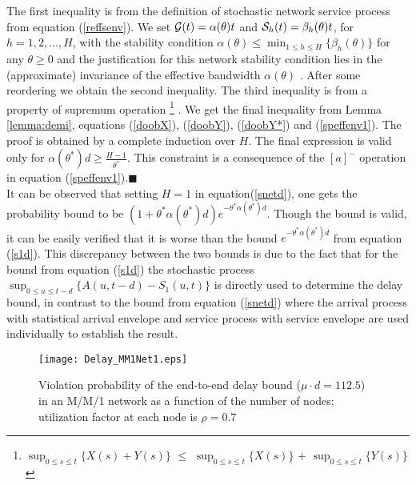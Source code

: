 \documentclass[letterpaper]{IEEEtran}
\begin{document}
The first inequality is from the definition of stochastic network service process from equation (\ref{reffsenv}). We set ${\cal G}(t) = \alpha(\theta)t$ and ${\cal S}_h(t) = \beta_h(\theta)t$, for $h = 1, 2, \ldots, H$, with the stability condition $\alpha(\theta) \le \min_{1\le h \le H }{\{ \beta_h(\theta)\}}$ for any $\theta \ge 0$ and the justification for this network stability condition lies in the (approximate) invariance of the effective bandwidth $\alpha(\theta)$ \cite{spects:2008}. After some reordering we obtain the second inequality. The third inequality is from a property of supremum operation \footnote{$ \sup_{0\le s \le t} \{X(s) + Y(s)\}$ $ \le $ $\sup_{0\le s \le t} \{X(s)\}$ $+$ $\sup_{0\le s \le t} \{Y(s)\}$} \cite{yuming:2006}. We get the final inequality from Lemma \ref{lemma:demi}, equations (\ref{doobX}), (\ref{doobY}), (\ref{doobY*}) and (\ref{speffenv1}). The proof is obtained by a complete induction over $H$. The final expression is valid only for $\alpha(\theta^*)d \ge \frac{H-1}{\theta^*}$. This constraint is a consequence of the $[a]^-$ operation in equation (\ref{speffenv1}).$\blacksquare$\\
It can be observed that setting $H=1$ in equation(\ref{snetd}), one gets the probability bound to be $(1+\theta^*\alpha(\theta^*)d)e^{-\theta^*\alpha(\theta^*)d}$. Though the bound is valid, it can be easily verified that it is worse than the bound $e^{-\theta^*\alpha(\theta^*)d}$ from equation (\ref{s1d}). This discrepancy between the two bounds is due to the fact that for the bound from equation (\ref{s1d}) the stochastic process $\sup_{0\le u \le t-d}\{A(u,t-d)-S_1(u,t)\}$ is directly used to determine the delay bound, in contrast to the bound from equation (\ref{snetd}) where the arrival process with statistical arrival envelope and service process with service envelope are used individually to establish the result. 
\begin{figure}
\centering
\texttt{[image: Delay\_MM1Net1.eps]}
\caption{Violation probability of the end-to-end delay bound ($\mu \cdot d=112.5$) in an M/M/1 network as a function of the number of
nodes; utilization factor at each node is $\rho = 0.7$}
\label{fig:demiDelay} \vspace{-5 mm}
\end{figure}
\end{document}
